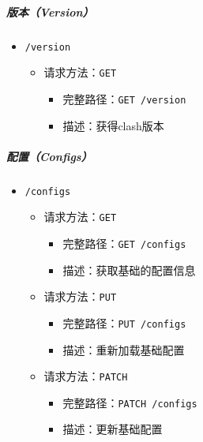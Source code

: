 \subparagraph{版本（Version）}
\begin{itemize}
    \item \verb|/version|
    \begin{itemize}
        \item 请求方法：\verb|GET|
        \begin{itemize}
            \item 完整路径：\verb|GET /version|
            \item 描述：获得clash版本
        \end{itemize}
    \end{itemize}
\end{itemize}

\subparagraph{配置（Configs）}
\begin{itemize}
    \item \verb|/configs|
    \begin{itemize}
        \item 请求方法：\verb|GET|
        \begin{itemize}
            \item 完整路径：\verb|GET /configs|
            \item 描述：获取基础的配置信息
        \end{itemize}
        \item 请求方法：\verb|PUT|
        \begin{itemize}
            \item 完整路径：\verb|PUT /configs|
            \item 描述：重新加载基础配置
        \end{itemize}
        \item 请求方法：\verb|PATCH|
        \begin{itemize}
            \item 完整路径：\verb|PATCH /configs|
            \item 描述：更新基础配置
        \end{itemize}
    \end{itemize}
\end{itemize}

